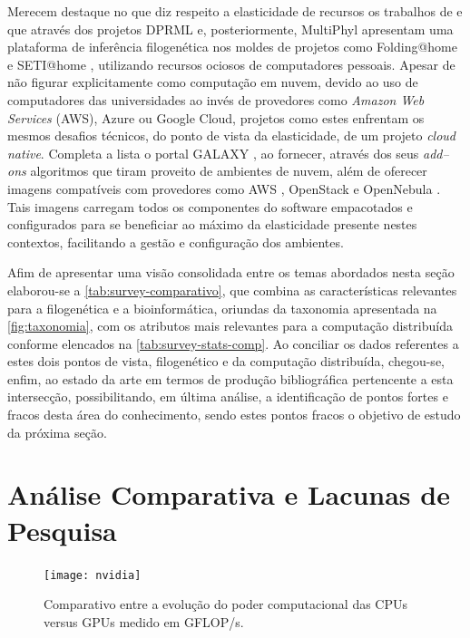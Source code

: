 \documentclass[english,brazilian]{UNISINOSmonografia} %
\newcommand\defaultFigureWidth{0.9}
\begin{document}
Merecem destaque no que diz respeito a elasticidade de recursos os trabalhos de  e  que através dos projetos DPRML e, posteriormente, MultiPhyl apresentam uma plataforma de inferência filogenética nos moldes de projetos como Folding@home \cite{Shirts2000,Larson2002} e SETI@home \cite{Korpela2001}, utilizando recursos ociosos de computadores pessoais.
Apesar de não figurar explicitamente como computação em nuvem, devido ao uso de computadores das universidades ao invés de provedores como \textit{Amazon Web Services} (AWS), Azure ou Google Cloud, projetos como estes enfrentam os mesmos desafios técnicos, do ponto de vista da elasticidade, de um projeto \textit{cloud native}.
Completa a lista o portal GALAXY \cite{Afgan2016}, ao fornecer, através dos seus \textit{add--ons} algoritmos que tiram proveito de ambientes de nuvem, além de oferecer imagens compatíveis com provedores como AWS \cite{Varia2017}, OpenStack \cite{Sefraoui2012} e OpenNebula \cite{Milojicic2011}.
Tais imagens carregam todos os componentes do software empacotados e configurados para se beneficiar ao máximo da elasticidade presente nestes contextos, facilitando a gestão e configuração dos ambientes.


Afim de apresentar uma visão consolidada entre os temas abordados nesta seção elaborou-se a \autoref{tab:survey-comparativo}, que combina as características relevantes para a filogenética e a bioinformática, oriundas da taxonomia apresentada na \autoref{fig:taxonomia}, com os atributos mais relevantes para a computação distribuída conforme elencados na \autoref{tab:survey-stats-comp}.
Ao conciliar os dados referentes a estes dois pontos de vista, filogenético e da computação distribuída, chegou-se, enfim, ao estado da arte em termos de produção bibliográfica pertencente a esta intersecção, possibilitando, em última análise, a identificação de pontos fortes e fracos desta área do conhecimento, sendo estes pontos fracos o objetivo de estudo da próxima seção.




\section{Análise Comparativa e Lacunas de Pesquisa}
\label{sec:lacunas-de-pesquisa}


\begin{figure}[tb]
	\centering%
	\begin{minipage}{\defaultFigureWidth\textwidth}
		\caption{Comparativo entre a evolução do poder computacional das CPUs versus GPUs medido em GFLOP/s.}
		\label{fig:gpu-power}
		\vspace{1ex}
		\texttt{[image: nvidia]}
	\end{minipage}
\end{figure}
\end{document}
